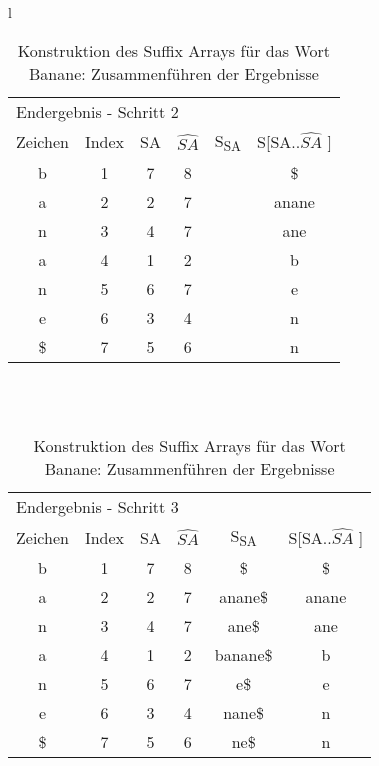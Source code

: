 \begin{table}[H]
\begin{center}
\begin{tabular}{l}
\begin{tabular}{cccccc}
\multicolumn{6}{l}{Endergebnis - Schritt 2}                                                                                                                 \\
Zeichen & Index & SA & \cellcolor[HTML]{\blue} $ \widehat{SA} $ & S\textsubscript{SA} & S{[}SA..$ \widehat{SA} $ {]} \\
b       & 1     & 7  & \cellcolor[HTML]{\blue}8  &     & \$            \\
a       & 2     & 2  & \cellcolor[HTML]{\blue}7  &     & anane         \\
n       & 3     & 4  & \cellcolor[HTML]{\blue}7  &     & ane           \\
a       & 4     & 1  & \cellcolor[HTML]{\blue}2  &     & b             \\
n       & 5     & 6  & \cellcolor[HTML]{\blue}7  &     & e             \\
e       & 6     & 3  & \cellcolor[HTML]{\blue}4  &     & n             \\
\$      & 7     & 5  & \cellcolor[HTML]{\blue}6  &     & n              
\end{tabular}

\\
\\

\begin{tabular}{cccccc}
\multicolumn{6}{l}{Endergebnis - Schritt 3}                                                                                                                 \\
Zeichen & Index & SA & $ \widehat{SA} $ & S\textsubscript{SA} & S{[}SA..$ \widehat{SA} $ {]} \\ \cline{5-5}
b       & 1     & 7  & \multicolumn{1}{c|}{8} & \multicolumn{1}{c|}{\$}       & \$            \\
a       & 2     & 2  & \multicolumn{1}{c|}{7} & \multicolumn{1}{c|}{anane\$}  & anane         \\
n       & 3     & 4  & \multicolumn{1}{c|}{7} & \multicolumn{1}{c|}{ane\$}    & ane           \\
a       & 4     & 1  & \multicolumn{1}{c|}{2} & \multicolumn{1}{c|}{banane\$} & b             \\
n       & 5     & 6  & \multicolumn{1}{c|}{7} & \multicolumn{1}{c|}{e\$}      & e             \\
e       & 6     & 3  & \multicolumn{1}{c|}{4} & \multicolumn{1}{c|}{nane\$}   & n             \\
\$      & 7     & 5  & \multicolumn{1}{c|}{6} & \multicolumn{1}{c|}{ne\$}     & n             \\ \cline{5-5}
\end{tabular}

\end{tabular}
\end{center}

\caption[Konstruktion des Suffix Arrays für das Wort Banane: Zusammenführen der Ergebnisse]{Konstruktion des Suffix Arrays für das Wort Banane: Zusammenführen der Ergebnisse}
\label{fig_banane_2_end}
\end{table}
